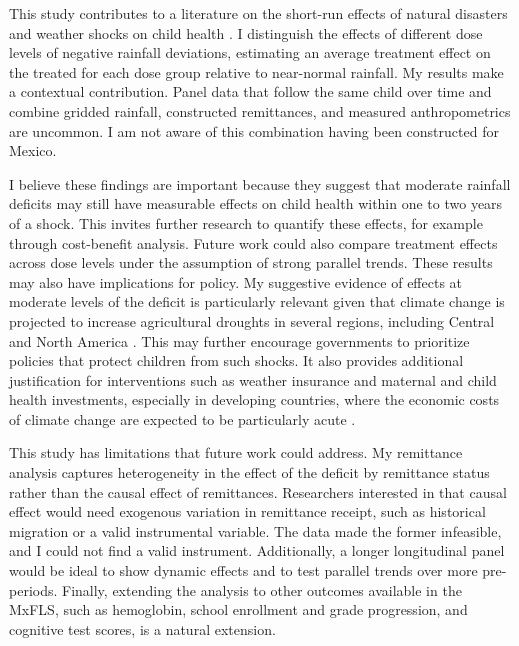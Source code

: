 This study contributes to a literature on the short-run effects of natural disasters and weather shocks on child health \parencite{datarImpactNaturalDisasters2013,hirvonenImpactEthiopias20152020,dodlovaEffects2010Haiti2023}. I distinguish the effects of different dose levels of negative rainfall deviations, estimating an average treatment effect on the treated for each dose group relative to near-normal rainfall. My results make a contextual contribution. Panel data that follow the same child over time and combine gridded rainfall, constructed remittances, and measured anthropometrics are uncommon. I am not aware of this combination having been constructed for Mexico.

I believe these findings are important because they suggest that moderate rainfall deficits may still have measurable effects on child health within one to two years of a shock. This invites further research to quantify these effects, for example through cost-benefit analysis. Future work could also compare treatment effects across dose levels under the assumption of strong parallel trends. These results may also have implications for policy. My suggestive evidence of effects at moderate levels of the deficit is particularly relevant given that climate change is projected to increase agricultural droughts in several regions, including Central and North America \parencite{ipccSummaryPolicymakers2021}. This may further encourage governments to prioritize policies that protect children from such shocks. It also provides additional justification for interventions such as weather insurance and maternal and child health investments, especially in developing countries, where the economic costs of climate change are expected to be particularly acute \parencite{jessoeClimateChangeLabour2018}.

This study has limitations that future work could address. My remittance analysis captures heterogeneity in the effect of the deficit by remittance status rather than the causal effect of remittances. Researchers interested in that causal effect would need exogenous variation in remittance receipt, such as historical migration or a valid instrumental variable. The data made the former infeasible, and I could not find a valid instrument. Additionally, a longer longitudinal panel would be ideal to show dynamic effects and to test parallel trends over more pre-periods. Finally, extending the analysis to other outcomes available in the MxFLS, such as hemoglobin, school enrollment and grade progression, and cognitive test scores, is a natural extension.

